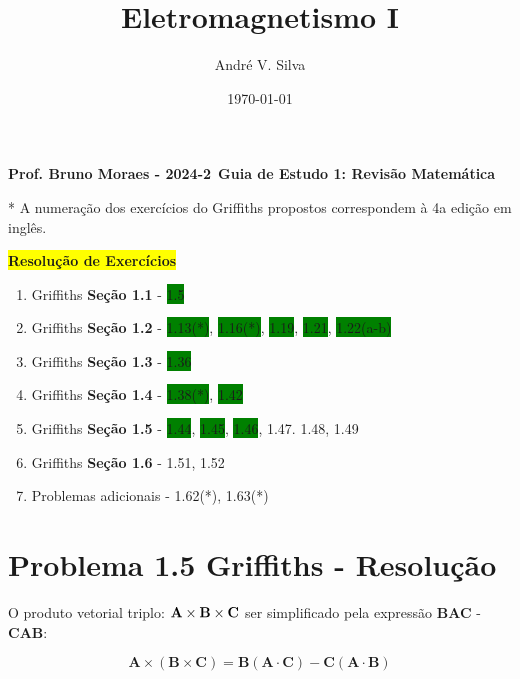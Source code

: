 \documentclass[a4paper,12pt]{article}
\title{ \textbf{\large Eletromagnetismo I }}
\author{Andr\'e V. Silva}
\date{\today}
\begin{document}
\maketitle

\begin{center}
    \textbf{Prof. Bruno Moraes - 2024-2}\
    \textbf{Guia de Estudo 1: Revisão Matemática}
    \end{center}
    
    * A numeração dos exercícios do Griffiths propostos correspondem à 4a edição em inglês.\\
    
    \begin{center}
    \colorbox{yellow}{\textbf{Resolu\c{c}\~ao de Exerc\'icios}}
    \end{center}
    
    \begin{enumerate}
    \item Griffiths \textbf{Seção 1.1} - \colorbox{green}{1.5} 
    \item Griffiths \textbf{Seção 1.2} - \colorbox{green}{1.13(*)}, \colorbox{green}{1.16(*)}, \colorbox{green}{1.19}, \colorbox{green}{1.21}, \colorbox{green}{1.22(a-b)}
    \item Griffiths \textbf{Seção 1.3} - \colorbox{green}{1.36}
    \item Griffiths \textbf{Seção 1.4} - \colorbox{green}{1.38(*)}, \colorbox{green}{1.42}
    \item Griffiths \textbf{Seção 1.5} - \colorbox{green}{1.44}, \colorbox{green}{1.45}, \colorbox{green}{1.46}, 1.47. 1.48, 1.49
    \item Griffiths \textbf{Seção 1.6} - 1.51, 1.52
    \item Problemas adicionais - 1.62(*), 1.63(*)
    \end{enumerate}

\section*{Problema 1.5 Griffiths - Resolu\c{c}\~ao}

O produto vetorial triplo: $\textrm{\textbf{A}}\times\textrm{\textbf{B}}\times\textrm{\textbf{C}}$
ser simplificado pela express\~ao \textbf{BAC} - \textbf{CAB}:

\begin{equation}
    \textbf{A}\times(\textbf{B}\times\textbf{C}) =  \textbf{B}(\textbf{A}\cdot\textbf{C}) - \textbf{C}(\textbf{A}\cdot\textbf{B})
\end{equation}
\end{document}
